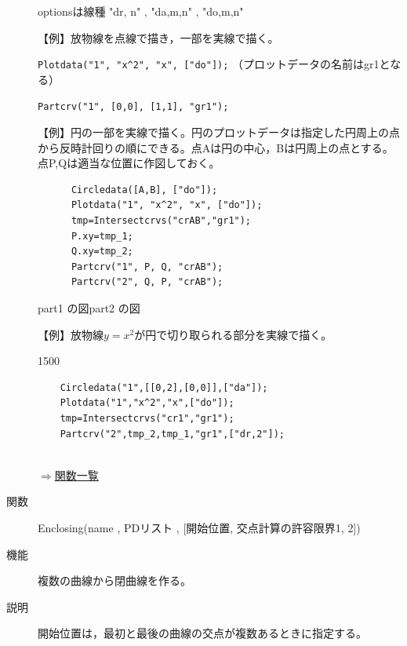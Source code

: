 \documentclass[papersize,a4paper,12pt,uplatex]{jsarticle}
\begin{document}
\begin{description}
optionsは線種      "dr, n"  , "da,m,n" , "do,m,n"

\vspace{\baselineskip}
【例】放物線を点線で描き，一部を実線で描く。
  
    \verb|Plotdata("1", "x^2", "x", ["do"]);|  （プロットデータの名前はgr1となる）
    
    \verb|Partcrv("1", [0,0], [1,1], "gr1");|

\begin{center}  \end{center}

【例】円の一部を実線で描く。円のプロットデータは指定した円周上の点から反時計回りの順にできる。点Aは円の中心，Bは円周上の点とする。点P,Qは適当な位置に作図しておく。
\begin{verbatim}
      Circledata([A,B], ["do"]);
      Plotdata("1", "x^2", "x", ["do"]);
      tmp=Intersectcrvs("crAB","gr1");
      P.xy=tmp_1;
      Q.xy=tmp_2;
      Partcrv("1", P, Q, "crAB");
      Partcrv("2", Q, P, "crAB");
\end{verbatim}
\vspace{\baselineskip}
\hspace{10mm}  \hspace{10mm}  
 
\hspace{25mm}part1 の図\hspace{45mm}part2 の図

\vspace{\baselineskip}
【例】放物線$y=x^2$が円で切り取られる部分を実線で描く。

\begin{layer}{150}{0}
\end{layer}
\begin{verbatim}
    Circledata("1",[[0,2],[0,0]],["da"]);
    Plotdata("1","x^2","x",["do"]);
    tmp=Intersectcrvs("cr1","gr1");
    Partcrv("2",tmp_2,tmp_1,"gr1",["dr,2"]);
    
\end{verbatim}

\vspace{\baselineskip}

\begin{flushright}  \hyperlink{functionlist}{$\Rightarrow$関数一覧}\end{flushright}

\hypertarget{enclosing}{}
\item[関数]  Enclosing(name , PDリスト , [開始位置, 交点計算の許容限界1, 2])
\item[機能]  複数の曲線から閉曲線を作る。
\item[説明]  開始位置は，最初と最後の曲線の交点が複数あるときに指定する。


\end{description}
\end{document}
